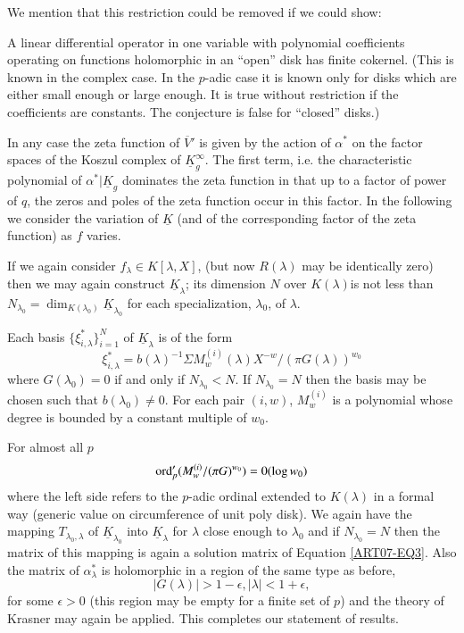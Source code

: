 We mention that this restriction could be removed if we could show:

\begin{conjecture*}
A linear differential operator in one variable with polynomial coefficients operating on functions holomorphic in an ``open'' disk has finite cokernel. (This is known in the complex case. In the $p$-adic case it is known only for disks which are either small enough or large enough. It is true without restriction if the coefficients are constants. The conjecture is false for ``closed'' disks.)
\end{conjecture*}

In any case the zeta function of $\overline{V}'$ is given by the action of $\alpha^{*}$ on the factor spaces of the Koszul complex of $\underline{K}^{\infty}_{g}$. The first term, i.e. the characteristic polynomial of $\alpha^{*}|\underline{K}_{g}$ dominates the zeta function in that up to a factor of power of $q$, the zeros and poles of the zeta function occur in this factor. In the following we consider the variation of $\underline{K}$ (and of the corresponding factor of the zeta function) as $f$ varies.

If we again consider $f_{\lambda}\in K[\lambda,X]$, (but now $R(\lambda)$ may be identically zero) then we may again construct $\underline{K}_{\lambda}$; its dimension $N$ over $K(\lambda)$\pageoriginale is not less than $N_{\lambda_{0}}=\dim_{K(\lambda_{0})}\underline{K}_{\lambda_{0}}$ for each specialization, $\lambda_{0}$, of $\lambda$.

\begin{theorem*}
Each basis $\{\xi^{*}_{i,\lambda}\}^{N}_{i=1}$ of $\underline{K}_{\lambda}$ is of the form
\begin{equation}
\xi^{*}_{i,\lambda}=b(\lambda)^{-1}\Sigma M_{w}^{(i)}(\lambda)X^{-w}/(\pi G(\lambda))^{w_{0}}\label{art07-eq5}
\end{equation}
where $G(\lambda_{0})=0$ if and only if $N_{\lambda_{0}}<N$. If $N_{\lambda_{0}}=N$ then the basis may be chosen such that $b(\lambda_{0})\neq 0$. For each pair $(i,w)$, $M^{(i)}_{w}$ is a polynomial whose degree is bounded by a constant multiple of $w_{0}$.
\end{theorem*}

For almost all $p$
\begin{equation}
\operatorname{\mathrm{ord}}'_{p}(M^{(i)}_{w}/(\pi G)^{w_{0}})=0(\log w_{0})\label{art07-eq6}
\end{equation}
where the left side refers to the $p$-adic ordinal extended to $K(\lambda)$ in a formal way (generic value on circumference of unit poly disk). We again have the mapping $T_{\lambda_{0},\lambda}$ of $\underline{K}_{\lambda_{0}}$ into $\underline{K}_{\lambda}$ for $\lambda$ close enough to $\lambda_{0}$ and if $N_{\lambda_{0}}=N$ then the matrix of this mapping is again a solution matrix of Equation \eqref{ART07-EQ3}. Also the matrix of $\alpha^{*}_{\lambda}$ is holomorphic in a region of the same type as before,
$$
|G(\lambda)|>1-\epsilon, |\lambda|<1+\epsilon,
$$
for some $\epsilon>0$ (this region may be empty for a finite set of $p$) and the theory of Krasner may again be applied. This completes our statement of results.

